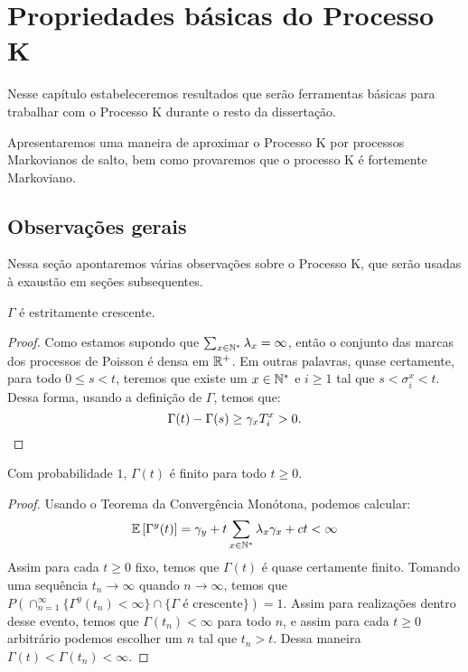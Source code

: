 \chapter{Propriedades básicas do Processo K}
\label{cap:propriedades}

Nesse capítulo estabeleceremos resultados que serão ferramentas
básicas para trabalhar com o Processo K durante o resto da
dissertação.

Apresentaremos uma maneira de aproximar o Processo K por processos
Markovianos de salto, bem como provaremos que o processo K é
fortemente Markoviano.


\section{Observações gerais}
\label{sec:observacoes}

Nessa seção apontaremos várias observações sobre o Processo K, que
serão usadas à exaustão em seções subsequentes.

\begin{proposicao}
  \label{prop:gamma-crescente}
  $\Gamma$ é \qc estritamente crescente.
\end{proposicao}
\begin{proof}
  Como estamos supondo que $\sum_{x \in {\mathbb{N^*}}} \lambda_x = \infty$,
  então o conjunto das marcas dos processos de Poisson é \qc densa em
  ${\mathbb{R}}^+$. Em outras palavras, quase certamente, para todo $0 \leq s <
  t$, teremos que existe um $x \in {\mathbb{N^*}}$ e $i \geq 1$ tal que $s <
  \sigma^x_i < t$. Dessa forma, usando a definição de $\Gamma$, temos
  que:
  \begin{displaymath}
    \Gamma(t) - \Gamma(s) \geq \gamma_x T^x_i > 0.
    \qedhere
  \end{displaymath}
\end{proof}

\begin{proposicao}
  \label{prop:gamma-finita}
  Com probabilidade $1$, $\Gamma(t)$ é finito para todo $t \geq 0$.
\end{proposicao}
\begin{proof}
  Usando o Teorema da Convergência Monótona, podemos calcular:
  \begin{displaymath}
    {\mathbb{E}} \left[\Gamma^y(t) \right] = \gamma_y + t \sum_{x \in {\mathbb{N^*}}}
    \lambda_x \gamma_x + ct < \infty
  \end{displaymath}
  Assim para cada $t \geq 0$ fixo, temos que $\Gamma(t)$ é quase
  certamente finito. Tomando uma sequência $t_n \to \infty$ quando $n
  \to \infty$, temos que $P(\cap_{n = 1}^{\infty} \{ \Gamma^y (t_n)
  < \infty \} \cap \{ \Gamma \textrm{ é crescente}\}) = 1$. Assim para
  realizações dentro desse evento, temos que $\Gamma(t_n) < \infty$
  para todo $n$, e assim para cada $t \geq 0$ arbitrário podemos
  escolher um $n$ tal que $t_n > t$. Dessa maneira $\Gamma(t) <
  \Gamma(t_n) < \infty$.
\end{proof}


